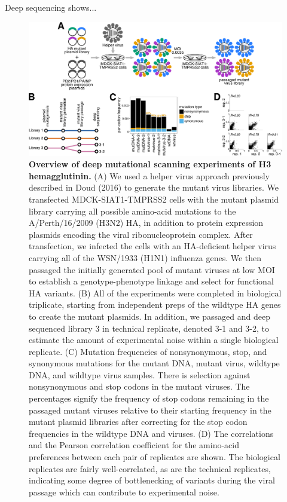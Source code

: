\documentclass[11pt]{article}
\begin{document}
Deep sequencing shows...


\begin{figure}
\centerline{\includegraphics[width=\textwidth]{figs/dms_overview/dms_overview.pdf}}
\caption{\label{fig:dms_overview}
{\bf Overview of deep mutational scanning experiments of H3 hemagglutinin.}
(A) We used a helper virus approach previously described in Doud (2016) to generate the mutant virus libraries. 
We transfected MDCK-SIAT1-TMPRSS2 cells with the mutant plasmid library carrying all possible amino-acid mutations to the A/Perth/16/2009 (H3N2) HA, in addition to protein expression plasmids encoding the viral ribonucleoprotein complex. 
After transfection, we infected the cells with an HA-deficient helper virus carrying all of the WSN/1933 (H1N1) influenza genes. 
We then passaged the initially generated pool of mutant viruses at low MOI to establish a genotype-phenotype linkage and select for functional HA variants. 
(B) All of the experiments were completed in biological triplicate, starting from independent preps of the wildtype HA genes to create the mutant plasmids. 
In addition, we passaged and deep sequenced library 3 in technical replicate, denoted 3-1 and 3-2, to estimate the amount of experimental noise within a single biological replicate.
(C) Mutation frequencies of nonsynonymous, stop, and synonymous mutations for the mutant DNA, mutant virus, wildtype DNA, and wildtype virus samples. 
There is selection against nonsynonymous and stop codons in the mutant viruses. 
The percentages signify the frequency of stop codons remaining in the passaged mutant viruses relative to their starting frequency in the mutant plasmid libraries after correcting for the stop codon frequencies in the wildtype DNA and viruses.
(D) The correlations and the Pearson correlation coefficient for the amino-acid preferences between each pair of replicates are shown. 
The biological replicates are fairly well-correlated, as are the technical replicates, indicating some degree of bottlenecking of variants during the viral passage which can contribute to experimental noise. 
}
\end{figure}
\end{document}
